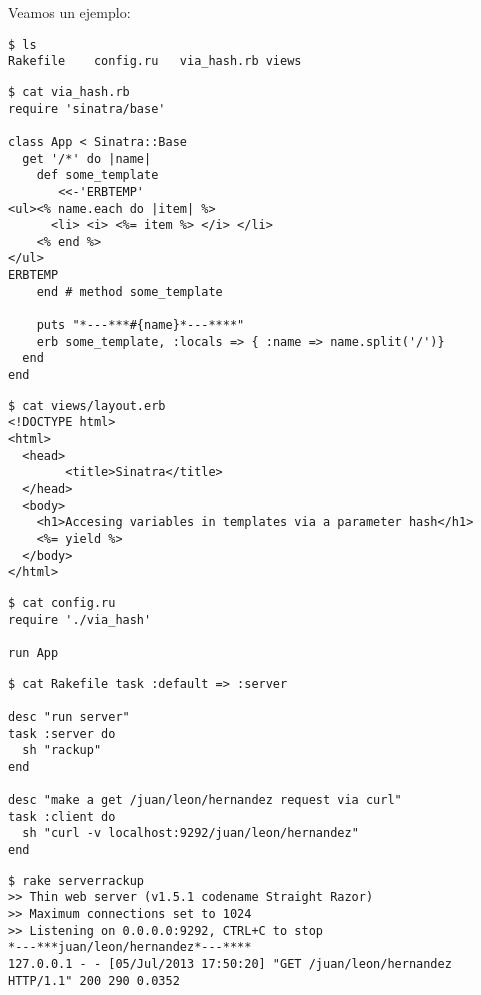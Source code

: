 Veamos un ejemplo:

\begin{verbatim}
$ ls
Rakefile    config.ru   via_hash.rb views
\end{verbatim}

\begin{verbatim}
$ cat via_hash.rb
require 'sinatra/base'

class App < Sinatra::Base
  get '/*' do |name|
    def some_template
       <<-'ERBTEMP'
<ul><% name.each do |item| %>
      <li> <i> <%= item %> </i> </li>
    <% end %>
</ul>
ERBTEMP
    end # method some_template

    puts "*---***#{name}*---****"
    erb some_template, :locals => { :name => name.split('/')}
  end
end
\end{verbatim}

\begin{verbatim}
$ cat views/layout.erb 
<!DOCTYPE html>
<html>
  <head>
        <title>Sinatra</title>
  </head>
  <body>
    <h1>Accesing variables in templates via a parameter hash</h1>
    <%= yield %>
  </body>
</html>
\end{verbatim}

\begin{verbatim}
$ cat config.ru 
require './via_hash'

run App
\end{verbatim}

\begin{verbatim}
$ cat Rakefile task :default => :server

desc "run server"
task :server do
  sh "rackup"
end

desc "make a get /juan/leon/hernandez request via curl"
task :client do
  sh "curl -v localhost:9292/juan/leon/hernandez"
end
\end{verbatim}

\begin{verbatim}
$ rake serverrackup
>> Thin web server (v1.5.1 codename Straight Razor)
>> Maximum connections set to 1024
>> Listening on 0.0.0.0:9292, CTRL+C to stop
*---***juan/leon/hernandez*---****
127.0.0.1 - - [05/Jul/2013 17:50:20] "GET /juan/leon/hernandez HTTP/1.1" 200 290 0.0352
\end{verbatim}

